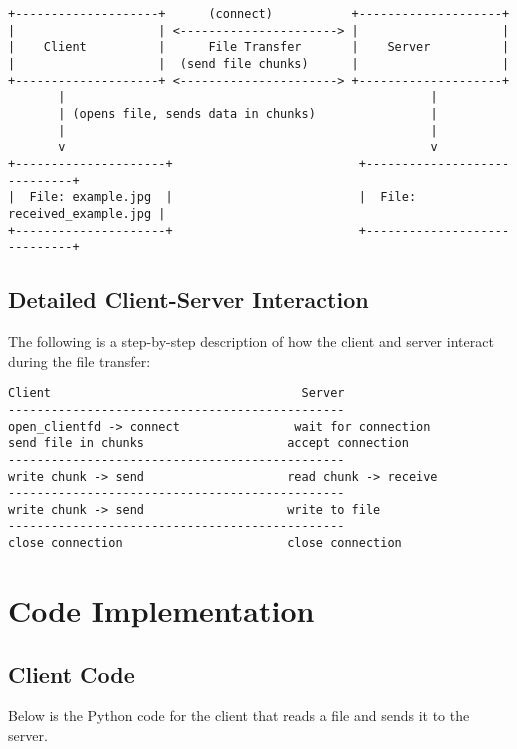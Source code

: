 \documentclass{article}
\begin{document}
\begin{verbatim}
+--------------------+      (connect)           +--------------------+
|                    | <----------------------> |                    |
|    Client          |      File Transfer       |    Server          |
|                    |  (send file chunks)      |                    |
+--------------------+ <----------------------> +--------------------+
       |                                                   |
       | (opens file, sends data in chunks)                |
       |                                                   |
       v                                                   v
+---------------------+                          +-----------------------------+
|  File: example.jpg  |                          |  File: received_example.jpg |
+---------------------+                          +-----------------------------+
\end{verbatim}

\subsection{Detailed Client-Server Interaction}
The following is a step-by-step description of how the client and server interact during the file transfer:

\begin{verbatim}
Client                                   Server
-----------------------------------------------
open_clientfd -> connect                wait for connection
send file in chunks                    accept connection
-----------------------------------------------
write chunk -> send                    read chunk -> receive
-----------------------------------------------
write chunk -> send                    write to file
-----------------------------------------------
close connection                       close connection
\end{verbatim}

\clearpage
\section{Code Implementation}

\subsection{Client Code}
Below is the Python code for the client that reads a file and sends it to the server.
\end{document}
